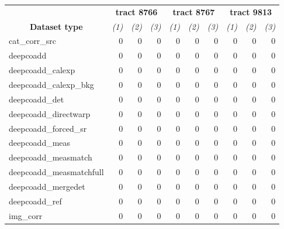 \begin{table}
	\caption{
		Provenance verification. For each tract we count the number of: (1)
		missing direct association of files with the processing attempt, (2)
		missing \emph{was-generated-by} association (from Open Provenance
		Model) of a file with the pipeline code execution that produced it, and
		(3) times the \emph{was-generated-by} association does not belong to
		the specified processing attempt.
	}
	\label{tab:provenance}
	\small
	\begin{longtable}{lrrrrrrrrr}
		\hline\hline
		                                          &
		\multicolumn{3}{c}{\textbf{tract 8766}}   &
		\multicolumn{3}{c}{\textbf{tract 8767}}   &
		\multicolumn{3}{c}{\textbf{tract 9813}}   \\
		\multicolumn{1}{c}{\textbf{Dataset type}} &
		\multicolumn{1}{c}{\textit{(1)}} &
		\multicolumn{1}{c}{\textit{(2)}} &
		\multicolumn{1}{c}{\textit{(3)}} &
		\multicolumn{1}{c}{\textit{(1)}} &
		\multicolumn{1}{c}{\textit{(2)}} &
		\multicolumn{1}{c}{\textit{(3)}} &
		\multicolumn{1}{c}{\textit{(1)}} &
		\multicolumn{1}{c}{\textit{(2)}} &
		\multicolumn{1}{c}{\textit{(3)}} \\
		\hline\hline
		cat\_corr\_src           & 0 & 0 & 0 & 0 & 0 & 0 & 0 & 0 & 0 \\
		deepcoadd                & 0 & 0 & 0 & 0 & 0 & 0 & 0 & 0 & 0 \\
		deepcoadd\_calexp        & 0 & 0 & 0 & 0 & 0 & 0 & 0 & 0 & 0 \\
		deepcoadd\_calexp\_bkg   & 0 & 0 & 0 & 0 & 0 & 0 & 0 & 0 & 0 \\
		deepcoadd\_det           & 0 & 0 & 0 & 0 & 0 & 0 & 0 & 0 & 0 \\
		deepcoadd\_directwarp    & 0 & 0 & 0 & 0 & 0 & 0 & 0 & 0 & 0 \\
		deepcoadd\_forced\_sr    & 0 & 0 & 0 & 0 & 0 & 0 & 0 & 0 & 0 \\
		deepcoadd\_meas          & 0 & 0 & 0 & 0 & 0 & 0 & 0 & 0 & 0 \\
		deepcoadd\_measmatch     & 0 & 0 & 0 & 0 & 0 & 0 & 0 & 0 & 0 \\
		deepcoadd\_measmatchfull & 0 & 0 & 0 & 0 & 0 & 0 & 0 & 0 & 0 \\
		deepcoadd\_mergedet      & 0 & 0 & 0 & 0 & 0 & 0 & 0 & 0 & 0 \\
		deepcoadd\_ref           & 0 & 0 & 0 & 0 & 0 & 0 & 0 & 0 & 0 \\
		img\_corr                & 0 & 0 & 0 & 0 & 0 & 0 & 0 & 0 & 0 \\

\end{longtable}
\end{table}
